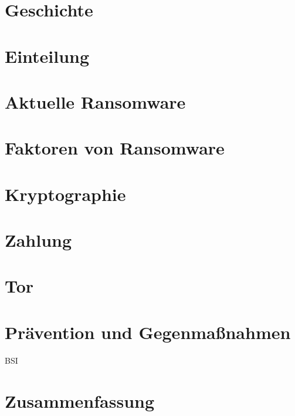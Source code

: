 \documentclass[runningheads,a4paper]{llncs}
\begin{document}
\section{Geschichte}


\section{Einteilung}


\section{Aktuelle Ransomware}


\section{Faktoren von Ransomware}


\section{Kryptographie}


\section{Zahlung}


\section{Tor}


\section{Prävention und Gegenmaßnahmen}
BSI \cite{BSI:Ransomware}


\section{Zusammenfassung}







\end{document}
